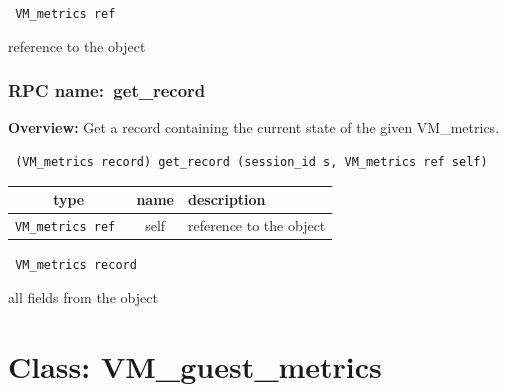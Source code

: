 \vspace{0.3cm}

{\tt 
VM\_metrics ref
}


reference to the object
\vspace{0.3cm}
\vspace{0.3cm}
\vspace{0.3cm}
\subsubsection{RPC name:~get\_record}

{\bf Overview:} 
Get a record containing the current state of the given VM\_metrics.

\begin{verbatim} (VM_metrics record) get_record (session_id s, VM_metrics ref self)\end{verbatim}



 
\vspace{0.3cm}
\begin{tabular}{|c|c|p{7cm}|}
 \hline
{\bf type} & {\bf name} & {\bf description} \\ \hline
{\tt VM\_metrics ref } & self & reference to the object \\ \hline 

\end{tabular}

\vspace{0.3cm}

{\tt 
VM\_metrics record
}


all fields from the object
\vspace{0.3cm}
\vspace{0.3cm}
\vspace{0.3cm}

\vspace{1cm}
\newpage
\section{Class: VM\_guest\_metrics}
